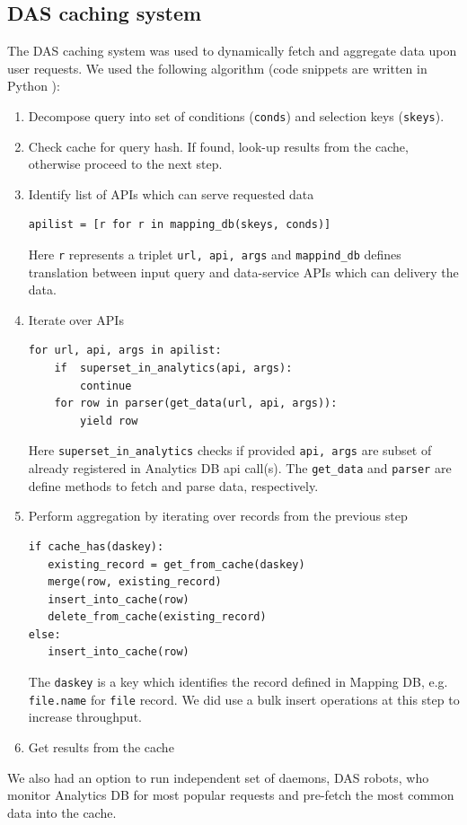 \documentclass[1p,times]{elsarticle}
\begin{document}
\subsection{DAS caching system}
The DAS caching system was used to dynamically fetch
and aggregate data upon user requests. We used the following 
algorithm (code snippets are written in Python \cite{Python}):
\begin{enumerate}[1.]
\item Decompose query into set of conditions (\verb+conds+) 
and selection keys (\verb+skeys+).
\item Check cache for query hash. If found, look-up results from the cache,
otherwise proceed to the next step.
\item Identify list of APIs which can serve requested data
\begin{verbatim}
apilist = [r for r in mapping_db(skeys, conds)]
\end{verbatim}
Here \verb+r+ represents a triplet \verb+url, api, args+ and 
\verb+mappind_db+ defines translation between input query and data-service
APIs which can delivery the data.
\item Iterate over APIs
\begin{verbatim}
for url, api, args in apilist:
    if  superset_in_analytics(api, args):
        continue
    for row in parser(get_data(url, api, args)):
        yield row
\end{verbatim}
Here \verb+superset_in_analytics+ checks if provided \verb+api, args+
are subset of already registered in Analytics DB api call(s). The 
\verb+get_data+ and \verb+parser+ are define methods to fetch and parse
data, respectively.
\item Perform aggregation by iterating over records from the previous step
\begin{verbatim}
if cache_has(daskey):
   existing_record = get_from_cache(daskey)
   merge(row, existing_record)
   insert_into_cache(row)
   delete_from_cache(existing_record)
else:
   insert_into_cache(row)
\end{verbatim}
The \verb+daskey+
is a key which identifies the record defined in Mapping DB, e.g. \verb+file.name+
for \verb+file+ record.
We did use a bulk insert operations at this step to increase throughput. 
\item Get results from the cache
\end{enumerate}
We also had an option to run independent set of daemons, DAS robots, who
monitor Analytics DB for most popular requests and pre-fetch the most
common data into the cache. 
\end{document}
